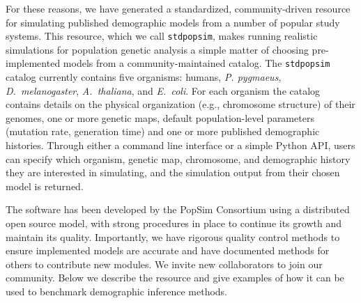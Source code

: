 \documentclass[12pt,halfline,a4paper]{ouparticle}
\newcommand{\stdpopsim}{\texttt{stdpopsim}\xspace}
\begin{document}

For these reasons, we have generated a standardized, community-driven resource
for simulating published demographic models from a number of popular study systems.
This resource, which we call \texttt{stdpopsim}, makes running
realistic simulations for population genetic analysis a simple matter of
choosing pre-implemented models from a community-maintained catalog.
The \stdpopsim catalog currently contains five organisms: humans, \emph{P. pygmaeus},
\emph{D.~melanogaster}, \emph{A.~thaliana}, and \emph{E.~coli}. For each
organism the catalog contains details on the physical organization (e.g., chromosome structure)
of their genomes, one or more genetic maps, default population-level parameters (mutation rate,
generation time) and one or more published demographic histories. Through
either a command line interface or a simple Python API, users can specify which
organism, genetic map, chromosome, and demographic history they are interested in simulating, and the
simulation output from their chosen model is returned.

The software has been developed by the PopSim Consortium using a
distributed open source model, with strong procedures in place
to continue its growth and maintain its quality.
Importantly, we have rigorous quality control methods to ensure implemented models are accurate
and have documented methods for others to contribute new modules.
We invite new collaborators to join our community.
Below we describe the resource and give
examples of how it can be used to benchmark demographic inference methods.
\end{document}
